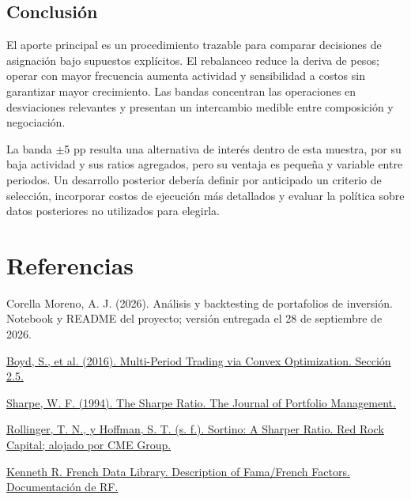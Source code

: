 \documentclass[11pt,letterpaper]{article}
\begin{document}
\subsection*{Conclusión}

El aporte principal es un procedimiento trazable para comparar decisiones de asignación bajo supuestos explícitos. El rebalanceo reduce la deriva de pesos; operar con mayor frecuencia aumenta actividad y sensibilidad a costos sin garantizar mayor crecimiento. Las bandas concentran las operaciones en desviaciones relevantes y presentan un intercambio medible entre composición y negociación.

La banda \ensuremath{\pm}5 pp resulta una alternativa de interés dentro de esta muestra, por su baja actividad y sus ratios agregados, pero su ventaja es pequeña y variable entre periodos. Un desarrollo posterior debería definir por anticipado un criterio de selección, incorporar costos de ejecución más detallados y evaluar la política sobre datos posteriores no utilizados para elegirla.


\clearpage

\section*{Referencias}

{\small\RaggedRight [1] Corella Moreno, A. J. (2026). Análisis y backtesting de portafolios de inversión. Notebook y README del proyecto; versión entregada el 28 de septiembre de 2026.\par}

{\small\RaggedRight [2] \href{https://stanford.edu/~boyd/papers/pdf/cvx_portfolio.pdf}{Boyd, S., et al. (2016). Multi-Period Trading via Convex Optimization. Sección 2.5.}\par}

{\small\RaggedRight [3] \href{https://web.stanford.edu/~wfsharpe/art/sr/sr.htm}{Sharpe, W. F. (1994). The Sharpe Ratio. The Journal of Portfolio Management.}\par}

{\small\RaggedRight [4] \href{https://www.cmegroup.com/content/dam/cmegroup/education/files/sortino-a-sharper-ratio.pdf}{Rollinger, T. N., y Hoffman, S. T. (s. f.). Sortino: A Sharper Ratio. Red Rock Capital; alojado por CME Group.}\par}

{\small\RaggedRight [5] \href{https://mba.tuck.dartmouth.edu/pages/faculty/ken.french/Data_Library/f-f_factors.html}{Kenneth R. French Data Library. Description of Fama/French Factors. Documentación de RF.}\par}
\end{document}
